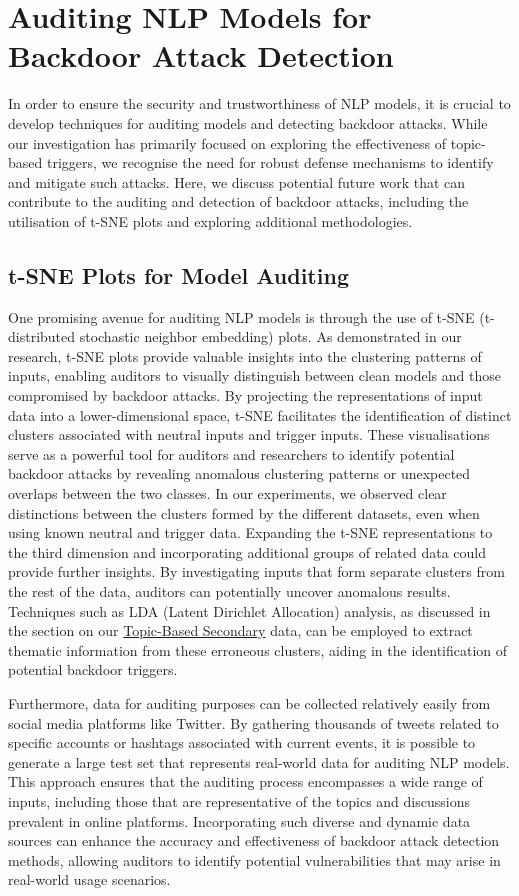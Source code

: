 \section{Auditing NLP Models for Backdoor Attack Detection}

In order to ensure the security and trustworthiness of NLP models, it is crucial to develop techniques for auditing models and detecting backdoor attacks. While our investigation has primarily focused on exploring the effectiveness of topic-based triggers, we recognise the need for robust defense mechanisms to identify and mitigate such attacks. Here, we discuss potential future work that can contribute to the auditing and detection of backdoor attacks, including the utilisation of t-SNE plots and exploring additional methodologies.

\subsection{t-SNE Plots for Model Auditing}

One promising avenue for auditing NLP models is through the use of t-SNE (t-distributed stochastic neighbor embedding) plots. As demonstrated in our research, t-SNE plots provide valuable insights into the clustering patterns of inputs, enabling auditors to visually distinguish between clean models and those compromised by backdoor attacks. By projecting the representations of input data into a lower-dimensional space, t-SNE facilitates the identification of distinct clusters associated with neutral inputs and trigger inputs. These visualisations serve as a powerful tool for auditors and researchers to identify potential backdoor attacks by revealing anomalous clustering patterns or unexpected overlaps between the two classes. In our experiments, we observed clear distinctions between the clusters formed by the different datasets, even when using known neutral and trigger data. Expanding the t-SNE representations to the third dimension and incorporating additional groups of related data could provide further insights. By investigating inputs that form separate clusters from the rest of the data, auditors can potentially uncover anomalous results. Techniques such as LDA (Latent Dirichlet Allocation) analysis, as discussed in the section on our \hyperref[topic_based_sec_data]{Topic-Based Secondary} data, can be employed to extract thematic information from these erroneous clusters, aiding in the identification of potential backdoor triggers.

Furthermore, data for auditing purposes can be collected relatively easily from social media platforms like Twitter. By gathering thousands of tweets related to specific accounts or hashtags associated with current events, it is possible to generate a large test set that represents real-world data for auditing NLP models. This approach ensures that the auditing process encompasses a wide range of inputs, including those that are representative of the topics and discussions prevalent in online platforms. Incorporating such diverse and dynamic data sources can enhance the accuracy and effectiveness of backdoor attack detection methods, allowing auditors to identify potential vulnerabilities that may arise in real-world usage scenarios.

